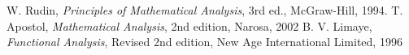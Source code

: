 \begin{thebibliography}{99}
             W. Rudin, \emph{Principles of Mathematical Analysis}, 3rd ed., McGraw-Hill, 1994.
             T. Apostol, \emph{Mathematical Analysis}, 2nd edition, Narosa, 2002
             B. V. Limaye, \emph{Functional Analysis}, Revised 2nd edition, New Age International Limited, 1996
\end{thebibliography}



